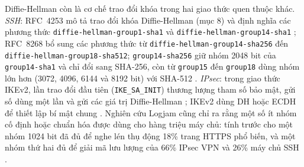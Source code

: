 Diffie-Hellman còn là cơ chế trao đổi khóa trong hai giao thức quen thuộc khác.
\emph{SSH}: RFC~4253 mô tả trao đổi khóa Diffie-Hellman (mục 8) và định nghĩa các
phương thức \texttt{diffie-hellman-\allowbreak group1-\allowbreak sha1} và
\texttt{diffie-hellman-\allowbreak group14-\allowbreak sha1} \cite{rfc4253}; RFC~8268 bổ sung các phương
thức từ \texttt{diffie-hellman-\allowbreak group14-\allowbreak sha256} đến
\texttt{diffie-hellman-\allowbreak group18-\allowbreak sha512}; \texttt{group14-\allowbreak sha256} giữ nhóm 2048 bit của \texttt{group14-\allowbreak sha1} và chỉ đổi sang SHA-256, còn từ \texttt{group15} đến \texttt{group18} dùng nhóm lớn hơn (3072, 4096, 6144 và 8192 bit) với SHA-512
\cite{rfc8268}. \emph{IPsec}: trong giao thức IKEv2, lần trao đổi đầu tiên
(\texttt{IKE\_\allowbreak SA\_\allowbreak INIT}) thương lượng tham số bảo mật, gửi số dùng một lần và gửi
các giá trị Diffie-Hellman \cite{rfc7296}; IKEv2 dùng DH hoặc ECDH để thiết lập
bí mật chung \cite{rfc9370}. Nghiên cứu Logjam cũng chỉ ra rằng một số ít nhóm cố
định hoặc chuẩn hóa được dùng cho hàng triệu máy chủ: tính trước cho một nhóm
1024 bit đã đủ để nghe lén thụ động 18\% trang HTTPS phổ biến, và một nhóm thứ hai
đủ để giải mã lưu lượng của 66\% IPsec VPN và 26\% máy chủ SSH
\cite{logjam-cacm}.
